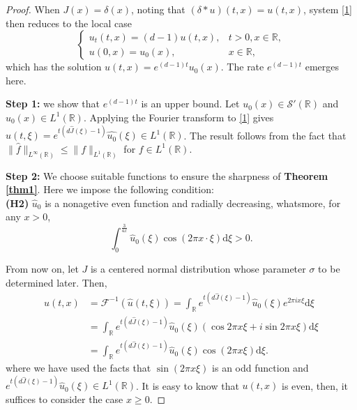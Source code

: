 \documentclass[10pt,a4paper]{amsart}
\newcommand{\R}{\mathbb{R}}
\newcommand{\dd}{\mathrm{d}}
\begin{document}
\begin{proof}
When \( J(x) = \delta(x) \), noting that \( (\delta * u)(t,x) = u(t,x) \), system \eqref{1} then reduces to the local case
\begin{equation*}
\begin{cases}
u_t(t,x) = (d-1)u(t,x), & t > 0, x \in \mathbb{R}, \\
u(0,x) = u_0(x), & x \in \mathbb{R},
\end{cases}
\end{equation*}
which has the solution \( u(t,x) = e^{(d-1)t}u_0(x) \). The rate \(e^{(d-1)t}\) emerges here.

{\bf Step 1:} we show that \(e^{(d-1)t}\) is an upper bound. Let $u_{0}(x)\in \mathscr{S}'(\mathbb{R})$ and $\hat{u}_{0}(x)\in L^{1}(\R)$. Applying the Fourier transform to \eqref{1} gives
\(\hat{u}(t,\xi) = e^{t(d\hat{J}(\xi)-1)}\hat{u_0}(\xi)\in L^1(\R)\). The result follows from the fact that $\parallel \hat{f}\parallel_{L^{\infty}(\mathbb{R})}\leq\parallel f\parallel_{L^{1}(\mathbb{R})}$ for $f\in L^{1}(\R)$.

{\bf Step 2:} We choose suitable functions to ensure the sharpness of \textbf{Theorem \ref{thm1}}. Here we impose the following condition:\\
\textbf{(H2)} \(\hat{u}_0\) is a nonagetive even function and radially decreasing, whatsmore, for any \(x>0\),
\begin{equation}\label{h2}
	\int_0^{\frac{3}{4x}}\hat{u}_0(\xi)\cos(2\pi x\cdot\xi)\dd\xi>0.
\end{equation}

From now on, let \(J\) is a centered normal distribution whose parameter \(\sigma\) to be determined later. Then,
\begin{align*}
	u(t,x) &= \mathscr{F}^{-1}\left(\hat{u}(t,\xi)\right) = \int_{\mathbb{R}} e^{t(d\hat{J}(\xi)-1)}\hat{u}_0(\xi)e^{2\pi i x \xi}\dd \xi \\
	&= \int_{\mathbb{R}} e^{t(d\hat{J}(\xi)-1)}\hat{u}_0(\xi)(\cos 2\pi x \xi + i \sin 2\pi x \xi)\dd \xi \\
	&= \int_{\mathbb{R}} e^{t(d\hat{J}(\xi)-1)}\hat{u}_0(\xi)\cos(2\pi x \xi)\dd \xi.
\end{align*}
where we have used the facts that \(\sin (2\pi x \xi)\) is an odd function and \(e^{t(d\hat{J}(\xi)-1)}\hat{u}_0(\xi)\in L^1(\R)\). It is easy to know that \(u(t,x)\) is even, then, it suffices to consider the case \(x \geq 0\). 


\end{proof}
\end{document}

